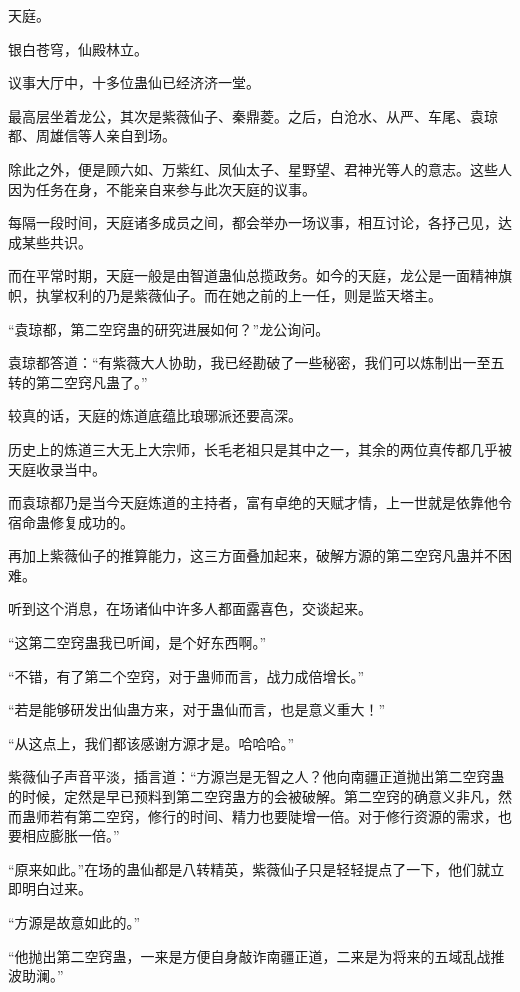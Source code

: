 
\begin{this_body}

天庭。

银白苍穹，仙殿林立。

议事大厅中，十多位蛊仙已经济济一堂。

最高层坐着龙公，其次是紫薇仙子、秦鼎菱。之后，白沧水、从严、车尾、袁琼都、周雄信等人亲自到场。

除此之外，便是顾六如、万紫红、凤仙太子、星野望、君神光等人的意志。这些人因为任务在身，不能亲自来参与此次天庭的议事。

每隔一段时间，天庭诸多成员之间，都会举办一场议事，相互讨论，各抒己见，达成某些共识。

而在平常时期，天庭一般是由智道蛊仙总揽政务。如今的天庭，龙公是一面精神旗帜，执掌权利的乃是紫薇仙子。而在她之前的上一任，则是监天塔主。

“袁琼都，第二空窍蛊的研究进展如何？”龙公询问。

袁琼都答道：“有紫薇大人协助，我已经勘破了一些秘密，我们可以炼制出一至五转的第二空窍凡蛊了。”

较真的话，天庭的炼道底蕴比琅琊派还要高深。

历史上的炼道三大无上大宗师，长毛老祖只是其中之一，其余的两位真传都几乎被天庭收录当中。

而袁琼都乃是当今天庭炼道的主持者，富有卓绝的天赋才情，上一世就是依靠他令宿命蛊修复成功的。

再加上紫薇仙子的推算能力，这三方面叠加起来，破解方源的第二空窍凡蛊并不困难。

听到这个消息，在场诸仙中许多人都面露喜色，交谈起来。

“这第二空窍蛊我已听闻，是个好东西啊。”

“不错，有了第二个空窍，对于蛊师而言，战力成倍增长。”

“若是能够研发出仙蛊方来，对于蛊仙而言，也是意义重大！”

“从这点上，我们都该感谢方源才是。哈哈哈。”

紫薇仙子声音平淡，插言道：“方源岂是无智之人？他向南疆正道抛出第二空窍蛊的时候，定然是早已预料到第二空窍蛊方的会被破解。第二空窍的确意义非凡，然而蛊师若有第二空窍，修行的时间、精力也要陡增一倍。对于修行资源的需求，也要相应膨胀一倍。”

“原来如此。”在场的蛊仙都是八转精英，紫薇仙子只是轻轻提点了一下，他们就立即明白过来。

“方源是故意如此的。”

“他抛出第二空窍蛊，一来是方便自身敲诈南疆正道，二来是为将来的五域乱战推波助澜。”


\end{this_body}
